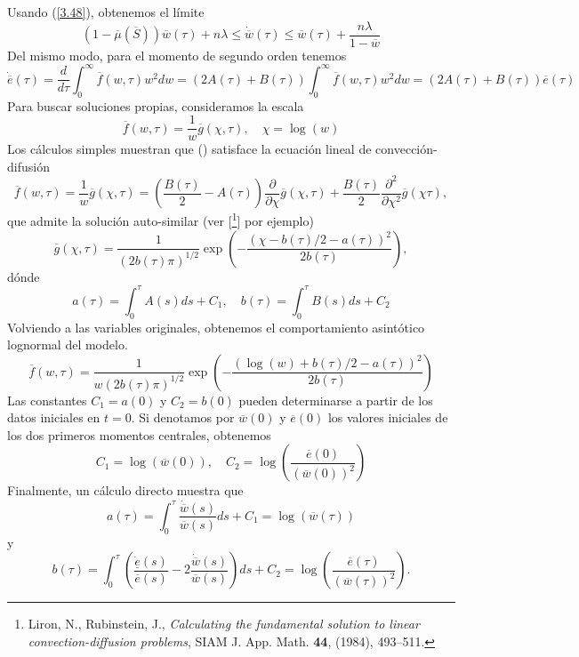 \documentclass[12pt,a4paper]{article}
\begin{document}
Usando (\ref{3.48}), obtenemos el límite
\begin{equation}
(1-\overline{\mu}(\overline{S}))\overline{w}(\tau)+n\lambda\leq \dot{\overline{w}} (\tau)\leq \overline{w}(\tau)+\frac{n\lambda}{1-\overline{w}}\label{3.53}
\end{equation}
Del mismo modo, para el momento de segundo orden tenemos
\begin{equation}
\dot{\overline{e}}(\tau)=\frac{d}{d\tau}\int^{\infty}_{0}\overline{f}(w,\tau)w^2dw=(2A(\tau)+B(\tau))\int^{\infty}_{0}\overline{f}(w,\tau)w^2dw=(2A(\tau)+B(\tau))\overline{e}(\tau) 
\end{equation}
\quad Para buscar soluciones propias, consideramos la escala
$$
\overline{f}(w,\tau)=\frac{1}{w}\overline{g}(\chi,\tau),\quad \chi=\log{(w)}
$$
Los cálculos simples muestran que () satisface la ecuación lineal de convección-difusión
$$
\overline{f}(w,\tau) = \frac{1}{w}\overline{g}(\chi,\tau)=\left(\frac{B(\tau)}{2}-A(\tau)\right)\frac{\partial}{\partial \chi}\overline{g}(\chi,\tau)+\frac{B(\tau)}{2}\frac{\partial^2}{\partial\chi^2}\overline{g}(\chi\tau),
$$
que admite la solución auto-similar (ver [\footnote{Liron, N., Rubinstein, J., \textit{Calculating the fundamental solution to linear convection-diffusion problems}, SIAM J. App. Math. \textbf{44}, (1984), 493–511.}] por ejemplo)
\begin{equation}
\overline{g}(\chi,\tau)=\frac{1}{(2b(\tau)\pi)^{1/2}}\exp\left(-\frac{(\chi -b(\tau)/2-a(\tau))^{2}}{2b(\tau)}\right),\label{3.55}
\end{equation}
dónde
$$
a(\tau) = \int^{\tau}_{0}A(s)ds+C_1,\quad b(\tau)=\int^{\tau}_{0}B(s)ds+C_2
$$
Volviendo a las variables originales, obtenemos el comportamiento asintótico lognormal del modelo.
\begin{equation}
\overline{f}(w,\tau)=\frac{1}{w(2b(\tau)\pi)^{1/2}}\exp{\left(-\frac{(\log(w)+b(\tau)/2-a(\tau))^{2}}{2b(\tau)}\right)}\label{3.56}
\end{equation}
Las constantes $C_1=a(0)$ y $C_2=b(0)$ pueden determinarse a partir de los datos iniciales en $t=0$. Si denotamos por $\overline{w}(0)$ y $\overline{e}(0)$ los valores iniciales de los dos primeros momentos centrales, obtenemos
$$
C_1=\log(\overline{w}(0)),\quad C_2=\log\left(\frac{\overline{e}(0)}{(\overline{w}(0))^2}\right)
$$
Finalmente, un cálculo directo muestra que
\begin{equation}
a(\tau)=\int^{\tau}_{0}\frac{\dot{\overline{w}}(s)}{\overline{w}(s)}ds+C_1=\log{(\overline{w}(\tau))}\label{3.57}
\end{equation}
y
\begin{equation}
b(\tau)=\int^{\tau}_{0}\left(\frac{\dot{\underline{e}}(s)}{\overline{e}(s)}-2\frac{\dot{\overline{w}}(s)}{\overline{w}(s)}\right)ds+ C_2=\log{\left(\frac{\overline{e}(\tau)}{(\overline{w}(\tau))^2} \right)}.\label{3.58}
\end{equation}
\end{document}
